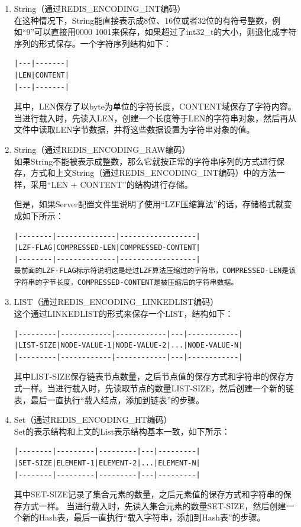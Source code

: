 \documentclass{zjutthesis}
\begin{document}
\begin{enumerate}[label=\arabic*.]

\item{
String（通过REDIS\_ENCODING\_INT编码）\\
在这种情况下，String能直接表示成8位、16位或者32位的有符号整数，例如“9”可以直接用0000 1001来保存，如果超过了int32\_t的大小，则退化成字符序列的形式保存。一个字符序列结构如下：
\begin{verbatim}
|---|-------|
|LEN|CONTENT|
|---|-------|
\end{verbatim}
其中，LEN保存了以byte为单位的字符长度，CONTENT域保存了字符内容。
当进行载入时，先读入LEN，创建一个长度等于LEN的字符串对象，然后再从文件中读取LEN字节数据，并将这些数据设置为字符串对象的值。
}

\item{
String（通过REDIS\_ENCODING\_RAW编码）\\
如果String不能被表示成整数，那么它就按正常的字符串序列的方式进行保存，方式和上文String（通过REDIS\_ENCODING\_INT编码）中的方法一样，采用“LEN + CONTENT”的结构进行存储。

但是，如果Server配置文件里说明了使用“LZF压缩算法”的话，存储格式就变成如下所示：
\begin{verbatim}
|--------|--------------|------------------|
|LZF-FLAG|COMPRESSED-LEN|COMPRESSED-CONTENT|
|--------|--------------|------------------|
最前面的LZF-FLAG标示符说明这是经过LZF算法压缩过的字符串，COMPRESSED-LEN是该字符串的字节长度，COMPRESSED-CONTENT是被压缩后的字符串数据。
\end{verbatim}
}

\item{
LIST（通过REDIS\_ENCODING\_LINKEDLIST编码）\\
这个通过LINKEDLIST的形式来保存一个LIST，结构如下：
\begin{verbatim}
|---------|------------|------------|---|------------|
|LIST-SIZE|NODE-VALUE-1|NODE-VALUE-2|...|NODE-VALUE-N|
|---------|------------|------------|---|------------|
\end{verbatim}
其中LIST-SIZE保存链表节点数量，之后节点值的保存方式和字符串的保存方式一样。当进行载入时，先读取节点的数量LIST-SIZE，然后创建一个新的链表，最后一直执行“载入结点，添加到链表”的步骤。
}

\item{
Set（通过REDIS\_ENCODING\_HT编码）\\
Set的表示结构和上文的List表示结构基本一致，如下所示：
\begin{verbatim}
|--------|---------|---------|---|---------|
|SET-SIZE|ELEMENT-1|ELEMENT-2|...|ELEMENT-N|
|--------|---------|---------|---|---------|
\end{verbatim}
其中SET-SIZE记录了集合元素的数量，之后元素值的保存方式和字符串的保存方式一样。
当进行载入时，先读入集合元素的数量SET-SIZE，然后创建一个新的Hash表，最后一直执行“载入字符串，添加到Hash表”的步骤。
}


\end{enumerate}
\end{document}
